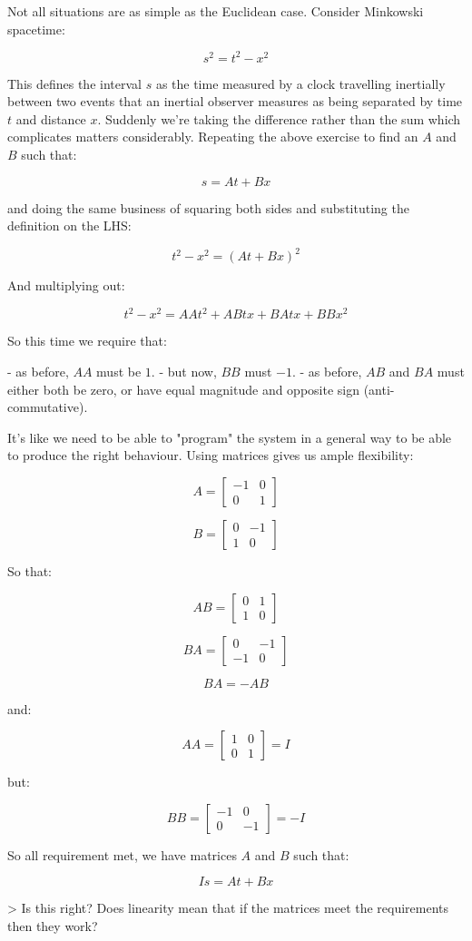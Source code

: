 Not all situations are as simple as the Euclidean case. Consider Minkowski spacetime:

$$s^2 = t^2 - x^2$$

This defines the interval $s$ as the time measured by a clock travelling inertially between two events that an inertial observer measures as being separated by time $t$ and distance $x$. Suddenly we're taking the difference rather than the sum which complicates matters considerably. Repeating the above exercise to find an $A$ and $B$ such that:

$$s = At + Bx$$

and doing the same business of squaring both sides and substituting the definition on the LHS:

$$t^2 - x^2 = (At + Bx)^2$$

And multiplying out:

$$
t^2 - x^2
= AAt^2 + ABtx + BAtx + BBx^2
$$

So this time we require that:

-   as before, $AA$ must be $1$.
-   but now, $BB$ must $-1$.
-   as before, $AB$ and $BA$ must either both be zero, or have equal magnitude and opposite sign (anti-commutative).

It's like we need to be able to "program" the system in a general way to be able to produce the right behaviour. Using matrices gives us ample flexibility:

$$A = \begin{bmatrix}-1 & 0 \\ 0 & 1\end{bmatrix}$$

$$
B = \begin{bmatrix}0 & -1 \\ 1 & 0\end{bmatrix}
$$

So that:

$$AB = \begin{bmatrix}0 & 1 \\ 1 & 0\end{bmatrix}$$

$$BA = \begin{bmatrix}0 & -1 \\ -1 & 0\end{bmatrix}$$

$$BA = -AB$$

and:

$$AA = \begin{bmatrix}1 & 0 \\ 0 & 1\end{bmatrix} = I$$

but:

$$BB = \begin{bmatrix}-1 & 0 \\ 0 & -1\end{bmatrix} = -I$$

So all requirement met, we have matrices $A$ and $B$ such that:

$$Is = At + Bx$$

> Is this right? Does linearity mean that if the matrices meet the requirements then they work?
